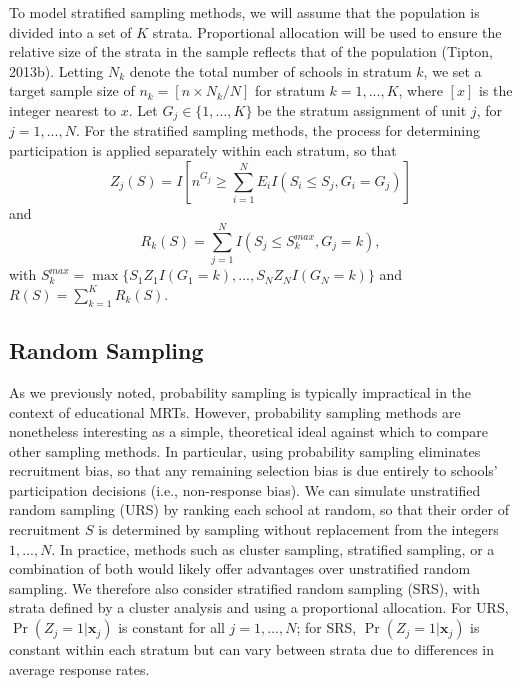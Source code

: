 \documentclass[
  english,
  man,floatsintext]{apa6}
\begin{document}
To model stratified sampling methods, we will assume that the population is divided into a set of \(K\) strata. Proportional allocation will be used to ensure the relative size of the strata in the sample reflects that of the population (Tipton, 2013b).
Letting \(N_k\) denote the total number of schools in stratum \(k\), we set a target sample size of \(n_k = [n \times N_k / N]\) for stratum \(k = 1,...,K\), where \([x]\) is the integer nearest to \(x\).
Let \(G_j \in \{1,...,K\}\) be the stratum assignment of unit \(j\), for \(j = 1,...,N\).
For the stratified sampling methods, the process for determining participation is applied separately within each stratum, so that
\begin{equation}
\label{eq:Zj-strat}
Z_j(S) = I\left[n^{G_j} \geq \sum_{i=1}^N E_i I\left(S_i \leq S_j, G_i = G_j\right)\right]
\end{equation}
and
\begin{equation}
\label{eq:R-strat}
R_k(S) = \sum_{j=1}^N I\left(S_j \leq S^{max}_k, G_j = k\right),
\end{equation}
with \(S^{max}_k = \max \{S_1 Z_1 I(G_1 = k), ..., S_N Z_N I(G_N = k)\}\) and \(R(S) = \sum_{k=1}^K R_k(S)\).

\hypertarget{random-sampling}{%
\subsection{Random Sampling}\label{random-sampling}}

As we previously noted, probability sampling is typically impractical in the context of educational MRTs. However, probability sampling methods are nonetheless interesting as a simple, theoretical ideal against which to compare other sampling methods.
In particular, using probability sampling eliminates recruitment bias, so that any remaining selection bias is due entirely to schools' participation decisions (i.e., non-response bias).
We can simulate unstratified random sampling (URS) by ranking each school at random, so that their order of recruitment \(S\) is determined by sampling without replacement from the integers \(1,...,N\). In practice, methods such as cluster sampling, stratified sampling, or a combination of both would likely offer advantages over unstratified random sampling. We therefore also consider stratified random sampling (SRS), with strata defined by a cluster analysis and using a proportional allocation. For URS, \(\Pr\left(Z_j = 1 | \mathbf{x}_j \right)\) is constant for all \(j = 1,...,N\); for SRS, \(\Pr\left(Z_j = 1 | \mathbf{x}_j \right)\) is constant within each stratum but can vary between strata due to differences in average response rates.
\end{document}
